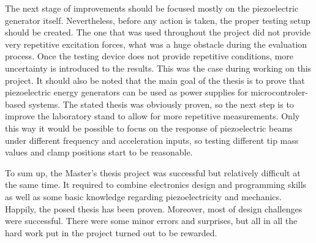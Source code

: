 \documentclass[12pt,a4paper]{article}
\begin{document}
\par
The next stage of improvements should be focused mostly on the piezoelectric generator itself. Nevertheless, before any action is taken, the proper testing setup should be created. The one that was used throughout the project did not provide very repetitive excitation forces, what was a huge obstacle during the evaluation process. Once the testing device does not provide repetitive conditions, more uncertainty is introduced to the results. This was the case during working on this project. It should also be noted that the main goal of the thesis is to prove that piezoelectric energy generators can be used as power supplies for microcontroler-based systems. The stated thesis was obviously proven, so the next step is to improve the laboratory stand to allow for more repetitive measurements. Only this way it would be possible to focus on the response of piezoelectric beams under different frequency and acceleration inputs, so testing different tip mass values and clamp positions start to be reasonable.
\par
To sum up, the Master's thesis project was successful but relatively difficult at the same time. It required to combine electronics design and programming skills as well as some basic knowledge regarding piezoelectricity and mechanics. Happily, the posed thesis has been proven. Moreover, most of design challenges were successful. There were some minor errors and surprises, but all in all the hard work put in the project turned out to be rewarded.

\FloatBarrier
\clearpage

\printbibliography

% 
%

\clearpage
\end{document}
